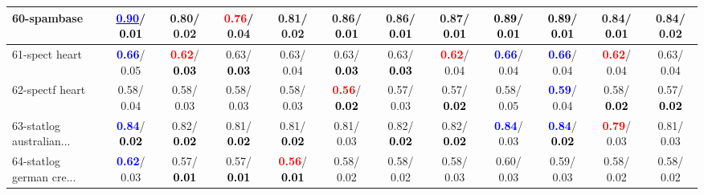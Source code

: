 \begin{table}[h]
\begin{center}
{\begin{tabular}{lc|c|c|c|c|c|c|c|c|c|c}
60-spambase & \underline{\textcolor{blue}{\textbf{  0.90}}}/\textcolor{black}{\textbf{  0.01}} &   0.80/  0.02 & \textcolor{red}{\textbf{  0.76}}/  0.04 &   0.81/  0.02 &   0.86/\textcolor{black}{\textbf{  0.01}} &   0.86/\textcolor{black}{\textbf{  0.01}} &   0.87/\textcolor{black}{\textbf{  0.01}} & \textcolor{black}{\textbf{  0.89}}/\textcolor{black}{\textbf{  0.01}} & \textcolor{black}{\textbf{  0.89}}/\textcolor{black}{\textbf{  0.01}} &   0.84/\textcolor{black}{\textbf{  0.01}} &   0.84/  0.02 \\ \hline
61-spect heart & \textcolor{blue}{\textbf{  0.66}}/  0.05 & \textcolor{red}{\textbf{  0.62}}/\textcolor{black}{\textbf{  0.03}} &   0.63/\textcolor{black}{\textbf{  0.03}} &   0.63/  0.04 &   0.63/\textcolor{black}{\textbf{  0.03}} &   0.63/\textcolor{black}{\textbf{  0.03}} & \textcolor{red}{\textbf{  0.62}}/  0.04 & \textcolor{blue}{\textbf{  0.66}}/  0.04 & \textcolor{blue}{\textbf{  0.66}}/  0.04 & \textcolor{red}{\textbf{  0.62}}/  0.04 &   0.63/  0.04 \\
62-spectf heart &   0.58/  0.04 &   0.58/  0.03 &   0.58/  0.03 &   0.58/  0.03 & \textcolor{red}{\textbf{  0.56}}/\textcolor{black}{\textbf{  0.02}} &   0.57/  0.03 &   0.57/\textcolor{black}{\textbf{  0.02}} &   0.58/  0.05 & \textcolor{blue}{\textbf{  0.59}}/  0.04 &   0.58/\textcolor{black}{\textbf{  0.02}} &   0.57/\textcolor{black}{\textbf{  0.02}} \\
63-statlog australian... & \textcolor{blue}{\textbf{  0.84}}/\textcolor{black}{\textbf{  0.02}} &   0.82/\textcolor{black}{\textbf{  0.02}} &   0.81/\textcolor{black}{\textbf{  0.02}} &   0.81/\textcolor{black}{\textbf{  0.02}} &   0.81/  0.03 &   0.82/\textcolor{black}{\textbf{  0.02}} &   0.82/\textcolor{black}{\textbf{  0.02}} & \textcolor{blue}{\textbf{  0.84}}/  0.03 & \textcolor{blue}{\textbf{  0.84}}/\textcolor{black}{\textbf{  0.02}} & \textcolor{red}{\textbf{  0.79}}/  0.03 &   0.81/  0.03 \\
64-statlog german cre... & \textcolor{blue}{\textbf{  0.62}}/  0.03 &   0.57/\textcolor{black}{\textbf{  0.01}} &   0.57/\textcolor{black}{\textbf{  0.01}} & \textcolor{red}{\textbf{  0.56}}/\textcolor{black}{\textbf{  0.01}} &   0.58/  0.02 &   0.58/  0.02 &   0.58/  0.03 &   0.60/  0.03 &   0.59/  0.03 &   0.58/  0.02 &   0.58/  0.02 \\\end{tabular}
}\label{strats1bRFw}
\end{center}
\end{table}
